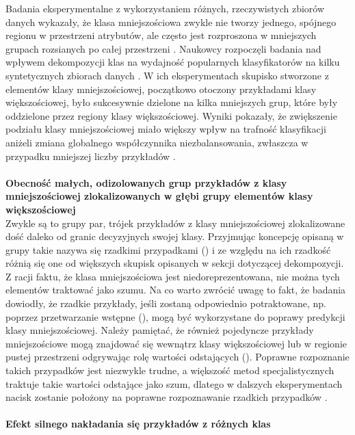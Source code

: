 \noindent Badania eksperymentalne z wykorzystaniem różnych, rzeczywistych zbiorów danych wykazały, że klasa mniejszościowa zwykle nie tworzy jednego, spójnego regionu w przestrzeni atrybutów, ale często jest rozproszona w mniejszych grupach rozsianych po całej przestrzeni \cite{Book:DataDistribution}\cite{Article:DataDistribution2}\cite{Inbook:DataDistribution}. Naukowcy rozpoczęli badania nad wpływem dekompozycji klas na wydajność popularnych klasyfikatorów na kilku syntetycznych zbiorach danych \cite{Article:DataDistribution}. W ich eksperymentach skupisko stworzone z elementów klasy mniejszościowej, początkowo otoczony przykładami klasy większościowej, było sukcesywnie dzielone na kilka mniejszych grup, które były oddzielone przez regiony klasy większościowej. Wyniki pokazały, że zwiększenie podziału klasy mniejszościowej miało większy wpływ na trafność klasyfikacji aniżeli zmiana globalnego współczynnika niezbalansowania, zwłaszcza w przypadku mniejszej liczby przykładów \cite{Article:TypyPrzykladow}.\\\\
\textbf{Obecność małych, odizolowanych grup przykładów z klasy mniejszościowej zlokalizowanych w głębi grupy elementów klasy większościowej}\\

\noindent Zwykle są to grupy par, trójek przykładów z klasy mniejszościowej zlokalizowane dość daleko od granic decyzyjnych swojej klasy. Przyjmując koncepcję opisaną w \cite{Article:DataDistribution3} grupy takie nazywa się rzadkimi przypadkami () i ze względu na ich rzadkość różnią się one od większych skupisk opisanych w sekcji dotyczącej dekompozycji. Z racji faktu, że klasa mniejszościowa jest niedoreprezentowana, nie można tych elementów traktować jako szumu. Na co warto zwrócić uwagę to fakt, że badania \cite{Article:DataDistribution2} dowiodły, że rzadkie przykłady, jeśli zostaną odpowiednio potraktowane, np. poprzez przetwarzanie wstępne (), mogą być wykorzystane do poprawy predykcji klasy mniejszościowej. Należy pamiętać, że również pojedyncze przykłady mniejszościowe mogą znajdować się wewnątrz klasy większościowej lub w regionie pustej przestrzeni odgrywając rolę wartości odstających (). Poprawne rozpoznanie takich przypadków jest niezwykle trudne, a większość metod specjalistycznych traktuje takie wartości odstające jako szum, dlatego w dalszych eksperymentach nacisk zostanie położony na poprawne rozpoznawanie rzadkich przypadków \cite{Article:TypyPrzykladow}.\\\\
\textbf{Efekt silnego nakładania się przykładów z różnych klas}\\

